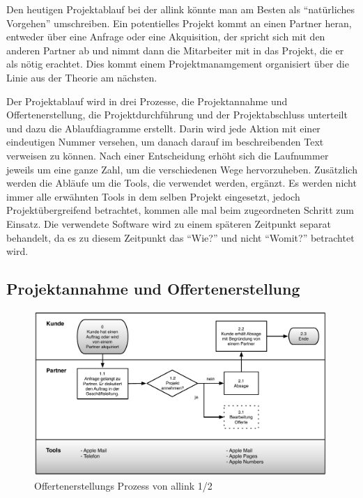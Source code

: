 Den heutigen Projektablauf bei der allink könnte man am Besten als ``natürliches Vorgehen''
umschreiben. Ein potentielles Projekt kommt an einen Partner heran, entweder über 
eine Anfrage oder eine Akquisition, der spricht sich mit den anderen Partner ab 
und nimmt dann die Mitarbeiter mit in das Projekt, die er als nötig erachtet.
Dies kommt einem Projektmanamgement organisiert über die Linie aus der Theorie
am nächsten.

Der Projektablauf wird in drei Prozesse, die Projektannahme und Offertenerstellung,
die Projektdurchführung und der Projektabschluss unterteilt und dazu die 
Ablaufdiagramme erstellt. Darin wird jede Aktion mit einer eindeutigen Nummer versehen,
um danach darauf im beschreibenden Text verweisen zu können. Nach einer Entscheidung erhöht
sich die Laufnummer jeweils um eine ganze Zahl, um die verschiedenen Wege hervorzuheben.
Zusätzlich werden die Abläufe um die Tools, die verwendet werden, ergänzt.
Es werden nicht immer alle erwähnten Tools in dem selben Projekt eingesetzt,
jedoch Projektübergreifend betrachtet, kommen alle mal beim zugeordneten Schritt 
zum Einsatz. Die verwendete Software wird zu einem späteren Zeitpunkt separat
behandelt, da es zu diesem Zeitpunkt das ``Wie?'' und nicht ``Womit?'' betrachtet
wird.

\clearpage

\subsection{Projektannahme und Offertenerstellung}

\begin{figure}[p]
\begin{center}
\includegraphics[width=0.99\textwidth,angle=0]{./bilder/analyse/01_ist_prozesse_offerte_01.pdf}
\caption[Offertenerstellungs Prozess von allink 1/2]{Offertenerstellungs 
    Prozess von allink 1/2\footnotemark}
\label{pic:01_ist_prozesse_offerte_01}
\end{center}
\end{figure}

